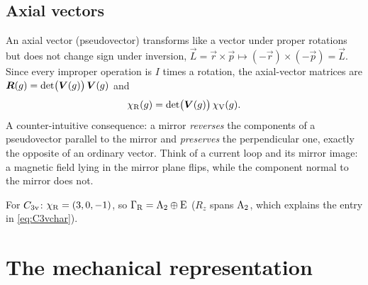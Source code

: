 \subsection{Axial vectors}
An axial vector (pseudovector) transforms like a vector under proper rotations but
does not change sign under inversion, $\vec{L}=\vec{r}\times\vec{p}\mapsto
(-\vec{r})\times(-\vec{p})=\vec{L}$. Since every improper operation is $I$ times a
rotation, the axial-vector matrices are $\bm{R}(g)=\det\bigl(\bm{V}(g)\bigr)\,\bm{V}(g)$
and
\begin{equation}\label{eq:chiR}
\chi_{\mathrm{R}}(g)=\det\bigl(\bm{V}(g)\bigr)\,\chi_{\mathrm{V}}(g).
\end{equation}
A counter-intuitive consequence: a mirror \emph{reverses} the components of a
pseudovector parallel to the mirror and \emph{preserves} the perpendicular one,
exactly the opposite of an ordinary vector. Think of a current loop and its mirror
image: a magnetic field lying in the mirror plane flips, while the component normal
to the mirror does not.

For $C_{3\mathrm{v}}$: $\chi_{\mathrm{R}}=(3,0,-1)$, so $\Gamma_{\mathrm{R}}=\mathrm{A}_2\oplus\mathrm{E}$ ($R_z$ spans $\mathrm{A}_2$,
which explains the entry in \eqref{eq:C3vchar}).

\section{The mechanical representation}\label{sec:mechanical}

